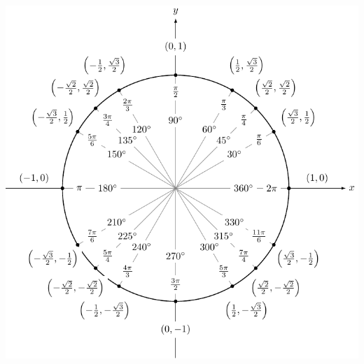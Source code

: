 \begin{smallhint}
\end{smallhint}
\begin{bighint}
\end{bighint}
\begin{activitySolution}
    \begin{center}
        \includegraphics[width=0.6\columnwidth]{figures/0-5-UnitCircle_FilledIn.pdf}
    \end{center}
\end{activitySolution}

\aftera
